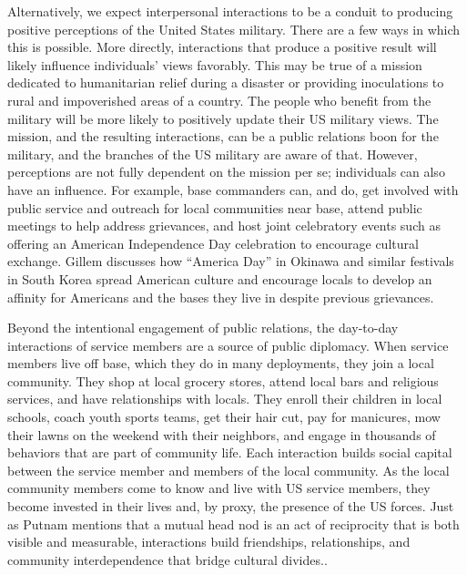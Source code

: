 Alternatively, we expect interpersonal interactions to be a conduit to producing positive perceptions of the United States military. There are a few ways in which this is possible. More directly, interactions that produce a positive result will likely influence individuals' views favorably. This may be true of a mission dedicated to humanitarian relief during a disaster or providing inoculations to rural and impoverished areas of a country. The people who benefit from the military will be more likely to positively update their US military views. The mission, and the resulting interactions, can be a public relations boon for the military, and the branches of the US military are aware of that.\autocite{Flynn2018} However, perceptions are not fully dependent on the mission per se; individuals can also have an influence. For example, base commanders can, and do, get involved with public service and outreach for local communities near base, attend public meetings to help address grievances, and host joint celebratory events such as offering an American Independence Day celebration to encourage cultural exchange.\autocite{rafthree20190719} Gillem discusses how ``America Day'' in Okinawa and similar festivals in South Korea spread American culture and encourage locals to develop an affinity for Americans and the bases they live in despite previous grievances.\autocite{Gillem2007} %

Beyond the intentional engagement of public relations, the day-to-day interactions of service members are a source of public diplomacy. When service members live off base, which they do in many deployments, they join a local community. They shop at local grocery stores, attend local bars and religious services, and have relationships with locals. They enroll their children in local schools, coach youth sports teams, get their hair cut, pay for manicures, mow their lawns on the weekend with their neighbors, and engage in thousands of behaviors that are part of community life. Each interaction builds social capital between the service member and members of the local community. As the local community members come to know and live with US service members, they become invested in their lives and, by proxy, the presence of the US forces. Just as Putnam mentions that a mutual head nod is an act of reciprocity that is both visible and measurable, interactions build friendships, relationships, and community interdependence that bridge cultural divides.\autocite{Putnam2001,Woolcock2000}. 

